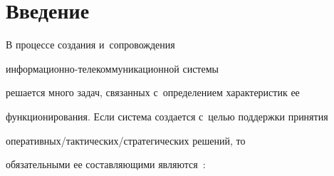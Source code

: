         























      \thispagestyle{headings}


      


      \vspace*{-18pt} 


        


\section{Введение}





      В процессе создания и~сопровождения  


ин\-фор\-ма\-ци\-он\-но-те\-ле\-ком\-му\-ни\-ка\-ци\-он\-ной системы 


решается много задач, связанных с~определением характеристик ее 


функционирования. Если система создается с~целью поддержки принятия  


опе\-ра\-тив\-ных\!/\!так\-ти\-че\-ских\!/\!стра\-те\-ги\-че\-ских решений, то 


обязательными ее со\-став\-ля\-ющи\-ми являются~\cite{2-bor}:


